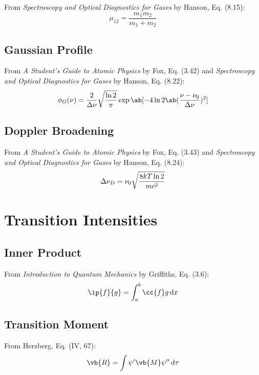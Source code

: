 \documentclass[11pt, twoside, fleqn]{report}
\begin{document}
From \textit{Spectroscopy and Optical Diagnostics for Gases} by Hanson, Eq. (8.15):
\begin{equation*}
    \mu_{12} = \frac{m_{1}m_{2}}{m_{1} + m_{2}}
\end{equation*}

\subsection{Gaussian Profile}

From \textit{A Student's Guide to Atomic Physics} by Fox, Eq. (3.42) and \textit{Spectroscopy and Optical Diagnostics for Gases} by Hanson, Eq. (8.22):
\begin{equation*}
    \phi_{G}(\nu) = \frac{2}{\adif{\nu}}\sqrt{\frac{\ln{2}}{\pi}}\exp\ab[-4\ln{2}\ab(\frac{\nu - \nu_{0}}{\adif{\nu}})^{2}]
\end{equation*}

\subsection{Doppler Broadening}

From \textit{A Student's Guide to Atomic Physics} by Fox, Eq. (3.43) and \textit{Spectroscopy and Optical Diagnostics for Gases} by Hanson, Eq. (8.24):
\begin{equation*}
    \adif{\nu}_{D} = \nu_{0}\sqrt{\frac{8kT\ln{2}}{mc^{2}}}
\end{equation*}

\section{Transition Intensities}

\subsection{Inner Product}

From \textit{Introduction to Quantum Mechanics} by Griffiths, Eq. (3.6):
\begin{equation*}
    \ip{f}{g} = \int_{a}^{b} \cc{f}g \odif{x}
\end{equation*}

\subsection{Transition Moment}

From Herzberg, Eq. (IV, 67):
\begin{equation*}
    \vb{R} = \int \psi'\vb{M}\psi'' \odif{\tau}
\end{equation*}
\end{document}
